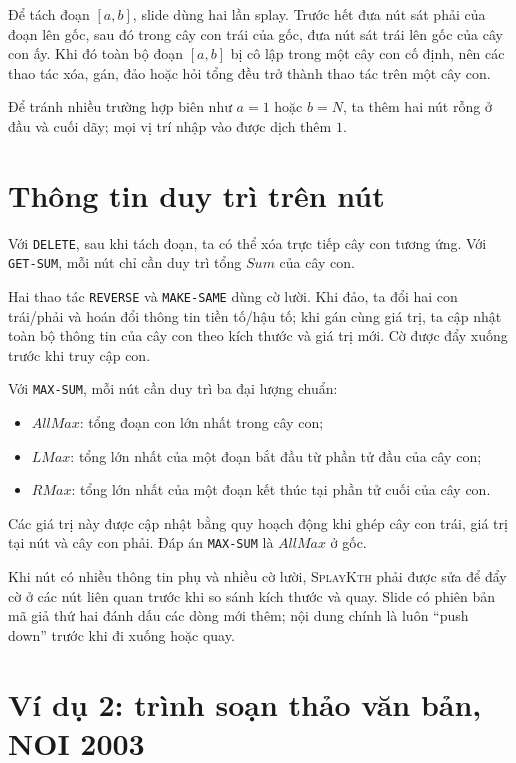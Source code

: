 \documentclass[11pt]{article}
\begin{document}
Để tách đoạn \([a,b]\), slide dùng hai lần splay. Trước hết đưa nút sát phải
của đoạn lên gốc, sau đó trong cây con trái của gốc, đưa nút sát trái lên gốc
của cây con ấy. Khi đó toàn bộ đoạn \([a,b]\) bị cô lập trong một cây con cố
định, nên các thao tác xóa, gán, đảo hoặc hỏi tổng đều trở thành thao tác trên
một cây con.

Để tránh nhiều trường hợp biên như \(a=1\) hoặc \(b=N\), ta thêm hai nút rỗng
ở đầu và cuối dãy; mọi vị trí nhập vào được dịch thêm \(1\).

\section{Thông tin duy trì trên nút}

Với \texttt{DELETE}, sau khi tách đoạn, ta có thể xóa trực tiếp cây con tương
ứng. Với \texttt{GET-SUM}, mỗi nút chỉ cần duy trì tổng \(\mathit{Sum}\) của
cây con.

Hai thao tác \texttt{REVERSE} và \texttt{MAKE-SAME} dùng cờ lười. Khi đảo, ta
đổi hai con trái/phải và hoán đổi thông tin tiền tố/hậu tố; khi gán cùng giá
trị, ta cập nhật toàn bộ thông tin của cây con theo kích thước và giá trị mới.
Cờ được đẩy xuống trước khi truy cập con.

Với \texttt{MAX-SUM}, mỗi nút cần duy trì ba đại lượng chuẩn:
\begin{itemize}
  \item \(\mathit{AllMax}\): tổng đoạn con lớn nhất trong cây con;
  \item \(\mathit{LMax}\): tổng lớn nhất của một đoạn bắt đầu từ phần tử đầu
  của cây con;
  \item \(\mathit{RMax}\): tổng lớn nhất của một đoạn kết thúc tại phần tử
  cuối của cây con.
\end{itemize}
Các giá trị này được cập nhật bằng quy hoạch động khi ghép cây con trái, giá
trị tại nút và cây con phải. Đáp án \texttt{MAX-SUM} là
\(\mathit{AllMax}\) ở gốc.

Khi nút có nhiều thông tin phụ và nhiều cờ lười, \textsc{SplayKth} phải được
sửa để đẩy cờ ở các nút liên quan trước khi so sánh kích thước và quay. Slide
có phiên bản mã giả thứ hai đánh dấu các dòng mới thêm; nội dung chính là luôn
``push down'' trước khi đi xuống hoặc quay.

\section{Ví dụ 2: trình soạn thảo văn bản, NOI 2003}
\end{document}
